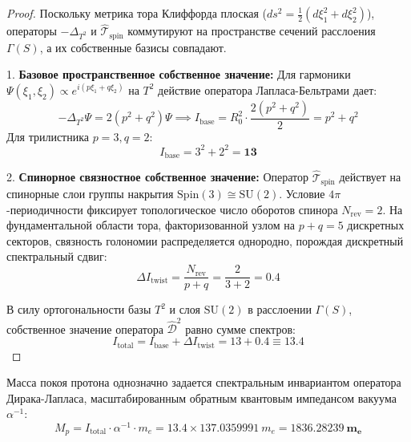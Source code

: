 \documentclass[12pt,a4paper]{article}
\begin{document}
	\begin{proof}
		Поскольку метрика тора Клиффорда плоская ($ds^2 = \frac{1}{2}(d\xi_1^2 + d\xi_2^2)$), операторы $-\Delta_{T^2}$ и $\hat{\mathcal{T}}_{\text{spin}}$ коммутируют на пространстве сечений расслоения $\Gamma(S)$, а их собственные базисы совпадают.
		
		1. \textbf{Базовое пространственное собственное значение:}
		Для гармоники $\Psi(\xi_1, \xi_2) \propto e^{i(p\xi_1 + q\xi_2)}$ на $T^2$ действие оператора Лапласа-Бельтрами дает:
		\begin{equation}
			-\Delta_{T^2} \Psi = 2 \left( p^2 + q^2 \right) \Psi \implies I_{\text{base}} = R_0^2 \cdot \frac{2(p^2 + q^2)}{2} = p^2 + q^2
		\end{equation}
		Для трилистника $p=3, q=2$:
		\begin{equation}
			I_{\text{base}} = 3^2 + 2^2 = \mathbf{13}
		\end{equation}
		
		2. \textbf{Спинорное связностное собственное значение:}
		Оператор $\hat{\mathcal{T}}_{\text{spin}}$ действует на спинорные слои группы накрытия $\mathrm{Spin}(3) \cong \mathrm{SU}(2)$. Условие $4\pi$-периодичности фиксирует топологическое число оборотов спинора $N_{\text{rev}} = 2$. На фундаментальной области тора, факторизованной узлом на $p+q = 5$ дискретных секторов, связность голономии распределяется однородно, порождая дискретный спектральный сдвиг:
		\begin{equation}
			\Delta I_{\text{twist}} = \frac{N_{\text{rev}}}{p + q} = \frac{2}{3 + 2} = \mathbf{0.4}
		\end{equation}
		
		В силу ортогональности базы $T^2$ и слоя $\mathrm{SU}(2)$ в расслоении $\Gamma(S)$, собственное значение оператора $\hat{\mathcal{D}}^2$ равно сумме спектров:
		\begin{equation}
			I_{\text{total}} = I_{\text{base}} + \Delta I_{\text{twist}} = 13 + 0.4 \equiv \mathbf{13.4}
		\end{equation}
	\end{proof}
	
	Масса покоя протона однозначно задается спектральным инвариантом оператора Дирака-Лапласа, масштабированным обратным квантовым импедансом вакуума $\alpha^{-1}$:
	\begin{equation}
		M_p = I_{\text{total}} \cdot \alpha^{-1} \cdot m_e = 13.4 \times 137.0359991 \ m_e = \mathbf{1836.28239 \ m_e}
	\end{equation}
	
\end{document}
